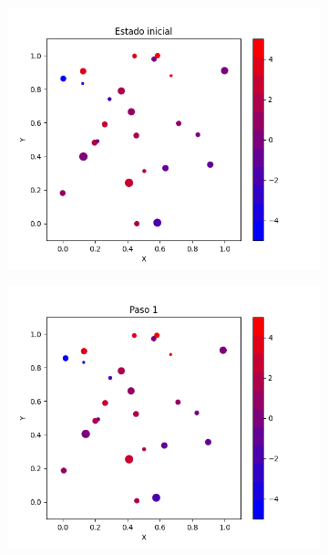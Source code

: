 \documentclass{report}
\begin{document}
\begin{figure}[h]
\centering
     \begin{subfigure}[b]{0.3\textwidth}
         \centering
         \includegraphics[width=\textwidth]{Images/Images_mc/p9pmc_t0.png}
     \end{subfigure}
     \begin{subfigure}[b]{0.3\textwidth}
         \centering
         \includegraphics[width=\textwidth]{Images/Images_mc/p9pmc_t01.png}
     \end{subfigure}
     \begin{subfigure}[b]{0.3\textwidth}

\end{subfigure}
\end{figure}
\end{document}
